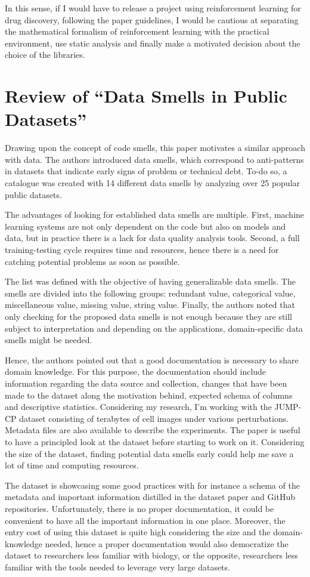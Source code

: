 \documentclass[11pt,a4paper]{article}
\begin{document}
In this sense, if I would have to release a project using reinforcement learning for drug discovery, following the paper guidelines, I would be cautious at separating the mathematical formalism of reinforcement learning with the practical environment, use static analysis and finally make a motivated decision about the choice of the libraries.
\section{Review of “Data Smells in Public Datasets”}
Drawing upon the concept of code smells, this paper motivates a similar approach with data. The authors introduced data smells, which correspond to anti-patterns in datasets that indicate early signs of problem or technical debt. To-do so, a catalogue was created with 14 different data smells by analyzing over 25 popular public datasets.

The advantages of looking for established data smells are multiple. First, machine learning systems are not only dependent on the code but also on models and data, but in practice there is a lack for data quality analysis tools. Second, a full training-testing cycle requires time and resources, hence there is a need for catching potential problems as soon as possible.

The list was defined with the objective of having generalizable data smells. The smells are divided into the following groups: redundant value, categorical value, miscellaneous value, missing value, string value. 
Finally, the authors noted that only checking for the proposed data smells is not enough because they are still subject to interpretation and depending on the applications, domain-specific data smells might be needed.

Hence, the authors pointed out that a good documentation is necessary to share domain knowledge. For this purpose, the documentation should include information regarding the data source and collection, changes that have been made to the dataset along the motivation behind, expected schema of columns and descriptive statistics.
Considering my research, I’m working with the JUMP-CP dataset consisting of terabytes of cell images under various perturbations. Metadata files are also available to describe the experiments. The paper is useful to have a principled look at the dataset before starting to work on it. Considering the size of the dataset, finding potential data smells early could help me save a lot of time and computing resources.

The dataset is showcasing some good practices with for instance a schema of the metadata and important information distilled in the dataset paper and GitHub repositories. Unfortunately, there is no proper documentation, it could be convenient to have all the important information in one place. Moreover, the entry cost of using this dataset is quite high considering the size and the domain-knowledge needed, hence a proper documentation would also democratize the dataset to researchers less familiar with biology, or the opposite, researchers less familiar with the tools needed to leverage very large datasets.
\end{document}
